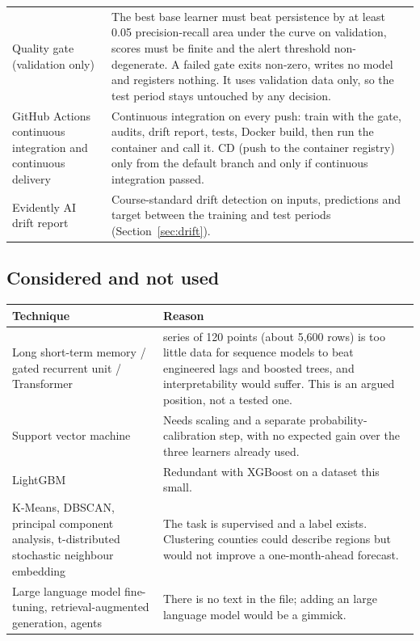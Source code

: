 \documentclass[11pt,a4paper]{article}
\begin{document}
\begin{longtable}{@{}>{\raggedright\arraybackslash}p{3.7cm}>{\raggedright\arraybackslash}p{11.9cm}@{}}
Quality gate (validation only) & The best base learner must beat persistence by at least 0.05 precision-recall area under the curve on validation, scores must be finite and the alert threshold non-degenerate. A failed gate exits non-zero, writes no model and registers nothing. It uses validation data only, so the test period stays untouched by any decision. \\
GitHub Actions continuous integration and continuous delivery & Continuous integration on every push: train with the gate, audits, drift report, tests, Docker build, then run the container and call it. CD (push to the container registry) only from the default branch and only if continuous integration passed. \\
Evidently AI drift report & Course-standard drift detection on inputs, predictions and target between the training and test periods (Section~\ref{sec:drift}). \\
\bottomrule
\end{longtable}

\subsection*{Considered and not used}
\begin{longtable}{@{}>{\raggedright\arraybackslash}p{3.7cm}>{\raggedright\arraybackslash}p{11.9cm}@{}}
\toprule
\textbf{Technique} & \textbf{Reason} \\
\midrule
\endhead
Long short-term memory / gated recurrent unit / Transformer & 47 series of 120 points (about 5{,}600 rows) is too little data for sequence models to beat engineered lags and boosted trees, and interpretability would suffer. This is an argued position, not a tested one. \\
Support vector machine & Needs scaling and a separate probability-calibration step, with no expected gain over the three learners already used. \\
LightGBM & Redundant with XGBoost on a dataset this small. \\
K-Means, DBSCAN, principal component analysis, t-distributed stochastic neighbour embedding & The task is supervised and a label exists. Clustering counties could describe regions but would not improve a one-month-ahead forecast. \\
Large language model fine-tuning, retrieval-augmented generation, agents & There is no text in the file; adding an large language model would be a gimmick. \\
\bottomrule
\end{longtable}
\end{document}
